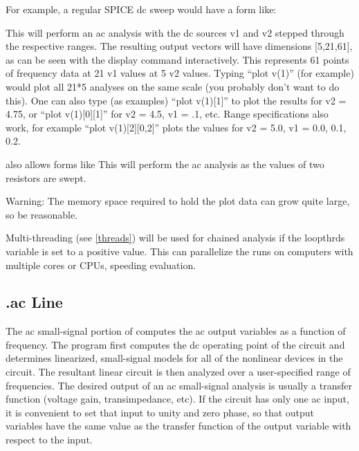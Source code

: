 For example, a regular SPICE dc sweep would have a form like:

This will perform an ac analysis with the dc sources {\vt v1} and {\vt
v2} stepped through the respective ranges.  The resulting output
vectors will have dimensions [5,21,61], as can be seen with the {\et
display} command interactively.  This represents 61 points of
frequency data at 21 {\vt v1} values at 5 {\vt v2} values.  Typing
``{\vt plot v(1)}'' (for example) would plot all 21*5 analyses on the
same scale (you probably don't want to do this).  One can also type
(as examples) ``{\vt plot v(1)[1]}'' to plot the results for {\vt v2}
= 4.75, or ``{\vt plot v(1)[0][1]}'' for {\vt v2} = 4.5, {\vt v1} =
.1, etc.  Range specifications also work, for example ``{\vt plot
v(1)[2][0,2]}'' plots the values for {\vt v2} = 5.0, {\vt v1} = 0.0,
0.1, 0.2.

{\WRspice} also allows forms like
This will perform the ac analysis as the values of two resistors
are swept.

Warning:  The memory space required to hold the plot data can grow
quite large, so be reasonable.

Multi-threading (see \ref{threads}) will be used for chained analysis
if the {\et loopthrds} variable is set to a positive value.  This can
parallelize the runs on computers with multiple cores or CPUs,
speeding evaluation.

\newcommand{\dcspec}{{dc {\it pstr1 start1\/} [{\it stop1\/} [{\it incr1\/}]]
 [{\it pstr2 start2\/} [{\it stop2\/} [{\it incr2\/}]]]}}

\subsection{{\vt .ac} Line}
\label{acline}


The ac small-signal portion of {\WRspice} computes the ac output
variables as a function of frequency.  The program first computes the
dc operating point of the circuit and determines linearized,
small-signal models for all of the nonlinear devices in the circuit. 
The resultant linear circuit is then analyzed over a user-specified
range of frequencies.  The desired output of an ac small-signal
analysis is usually a transfer function (voltage gain, transimpedance,
etc).  If the circuit has only one ac input, it is convenient to set
that input to unity and zero phase, so that output variables have the
same value as the transfer function of the output variable with
respect to the input.

